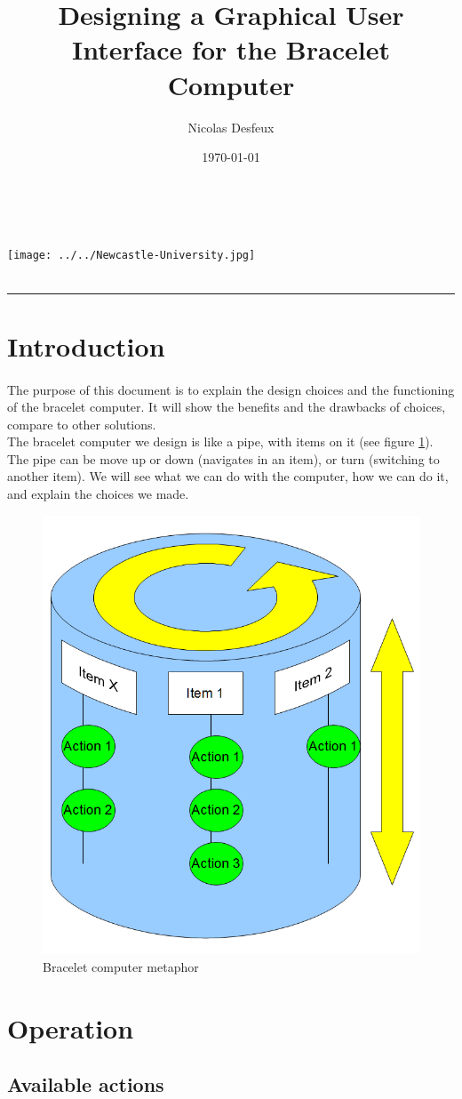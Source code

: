 \documentclass[a4paper,11pt]{article} %
\date{\today}
\author{Nicolas Desfeux}
\title{
\Huge{Designing a Graphical User Interface for the Bracelet Computer
}}
\makeatletter
\def\maketitle{

	\begin{multicols}{2}
		{\@author\\\texttt{\@email}}
		\begin{flushright}
			{\texttt{[image: ../../Newcastle-University.jpg]}}\\
			{\@date}\\
		\end{flushright}
	\end{multicols}
	\vspace{1cm}
	\begin{center}
		{\LARGE \@title}
		\rule{10cm}{1pt}
	\end{center}
	\vspace{1cm}
}
\makeatother
\begin{document}
\maketitle


\section*{Introduction}
\paragraph{}The purpose of this document is to explain the design choices and the functioning of the bracelet computer. It will show the benefits and the drawbacks of choices, compare to other solutions. \\The bracelet computer we design is like a pipe, with items on it (see figure \ref{draw}). The pipe can be move up or down (navigates in an item), or turn (switching to another item). We will see what we can do with the computer, how we can do it, and explain the choices we made.

\begin{figure}[!h]
\centering
\includegraphics[width=0.5\linewidth]{computer.png}
\caption{Bracelet computer metaphor}
\label{draw}
\end{figure}
\section{Operation}
\subsection{Available actions}
\end{document}
